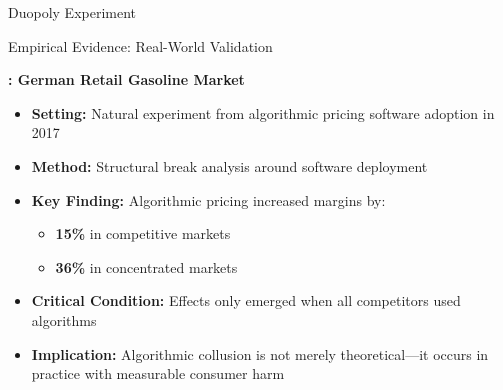 \documentclass[10pt, aspectratio=169]{beamer}
\begin{document}
\begin{frame}{Duopoly Experiment}
\centering
\begin{minipage}[b]{0.48\linewidth}
    \centering
    
    
\end{minipage}
\hfill
\begin{minipage}[b]{0.48\linewidth}
    \centering
    
    
\end{minipage}
\end{frame}

\begin{frame}{Empirical Evidence: Real-World Validation}
    \begin{center}
    \begin{block}{\textbf{\textcite{assad_algorithmic_2024}: German Retail Gasoline Market}}
    \begin{itemize}
        \item \textbf{Setting:} Natural experiment from algorithmic pricing software adoption in 2017
        \item \textbf{Method:} Structural break analysis around software deployment
        \item \textbf{Key Finding:} Algorithmic pricing increased margins by:
        \begin{itemize}
            \item \textbf{15\%} in competitive markets
            \item \textbf{36\%} in concentrated markets
        \end{itemize}
        \item \textbf{Critical Condition:} Effects only emerged when all competitors used algorithms
        \item \textbf{Implication:} Algorithmic collusion is not merely theoretical---it occurs in practice with measurable consumer harm
    \end{itemize}
    \end{block}
    \end{center}
\end{frame}
\end{document}
